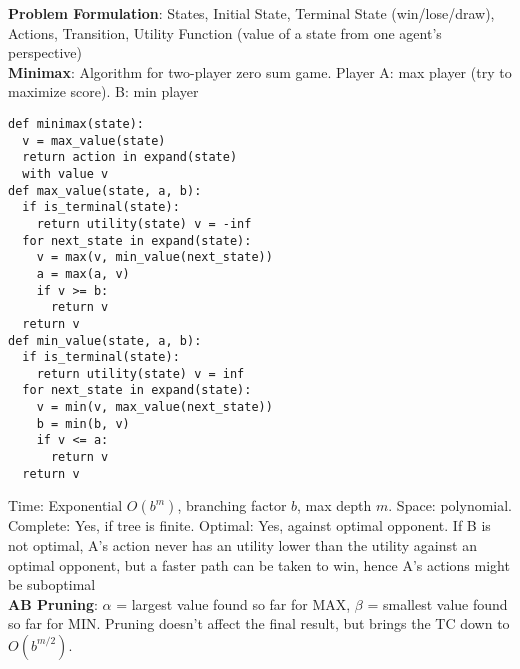 \documentclass{article}
\begin{document}
\begin{multicols*}{3}
\textbf{Problem Formulation}: States, Initial State, Terminal State (win/lose/draw), Actions, Transition, Utility Function (value of a state from one agent's perspective) \\
\textbf{Minimax}: Algorithm for two-player zero sum game. Player A: max player (try to maximize score). B: min player\\
\vspace{-0.6cm}
\begin{verbatim}
def minimax(state):
  v = max_value(state)
  return action in expand(state) 
  with value v
def max_value(state, a, b):
  if is_terminal(state): 
    return utility(state) v = -inf 
  for next_state in expand(state):
    v = max(v, min_value(next_state)) 
    a = max(a, v)
    if v >= b:
      return v
  return v
def min_value(state, a, b):
  if is_terminal(state): 
    return utility(state) v = inf 
  for next_state in expand(state):
    v = min(v, max_value(next_state)) 
    b = min(b, v)
    if v <= a:
      return v
  return v    
\end{verbatim}
\vspace{-0.2cm}
Time: Exponential $O(b^m)$, branching factor $b$, max depth $m$. Space: polynomial. Complete: Yes, if tree is finite. Optimal: Yes, against optimal opponent. If B is not optimal, A's action never has an utility lower than the utility against an optimal opponent, but a faster path can be taken to win, hence A's actions might be suboptimal\\
\textbf{AB Pruning}: $\alpha$ = largest value found so far for MAX, $\beta$ = smallest value found so far for MIN. Pruning doesn't affect the final result, but brings the TC down to $O(b^{m/2})$.

\end{multicols*}
\end{document}
